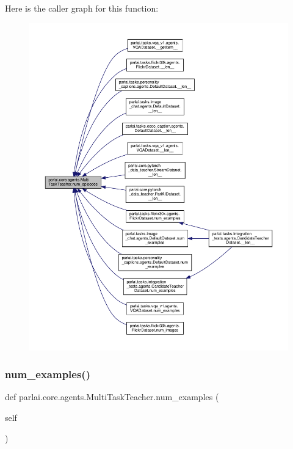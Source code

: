 Here is the caller graph for this function\+:
\nopagebreak
\begin{figure}[H]
\begin{center}
\leavevmode
\includegraphics[width=350pt]{classparlai_1_1core_1_1agents_1_1MultiTaskTeacher_ac292d1cb86a3769c352e2d3658f324d2_icgraph}
\end{center}
\end{figure}
\mbox{\label{classparlai_1_1core_1_1agents_1_1MultiTaskTeacher_a21fa6d0565bd35e54a74806ecca62e34}} 
\subsubsection{\texorpdfstring{num\+\_\+examples()}{num\_examples()}}
{\footnotesize\ttfamily def parlai.\+core.\+agents.\+Multi\+Task\+Teacher.\+num\+\_\+examples (\begin{DoxyParamCaption}\item[{}]{self }\end{DoxyParamCaption})}

